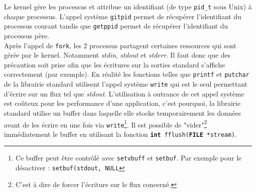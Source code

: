 Le kernel gère les processus et attribue un identifiant (de type \texttt{pid\_t} sous Unix) à chaque processus. L'appel système \texttt{gitpid} permet de récupérer l'identifiant du processus courant tandis que \texttt{getppid} permet de récupérer l'identifiant du processus père. \\

Après l'appel de \texttt{fork}, les 2 processus partagent certaines ressources qui sont gérée par le kernel. Notamment \textit{stdin}, \textit{stdout} et \textit{stderr}. Il faut donc que des précaution soit prise afin que les écritures sur la sorties standard s'affiche correctement (par exemple). En réalité les fonctions telles que \texttt{printf} et \texttt{putchar} de la librairie standard utilisent l'appel système \texttt{write} qui est le seul permettant d'écrire sur un flux tel que \textit{stdout}. L'utilisation à outrance de cet appel système est coûteux pour les performance d'une application, c'est pourquoi, la librairie standard utilise un buffer dans laquelle elle stocke temporairement les données avant de les écrire en une fois via \texttt{write}\footnote{Ce buffer peut être contrôlé avec \texttt{setvbuff} et \texttt{setbuf}. Par exemple pour le désactiver : \texttt{setbuf(stdout, NULL}}. Il est possible de "vider"\footnote{C'est à dire de forcer l'écriture sur le flux concerné.} immédiatement le buffer en utilisant la fonction \texttt{\textbf{int} fflush(\textbf{FILE} *stream)}.

